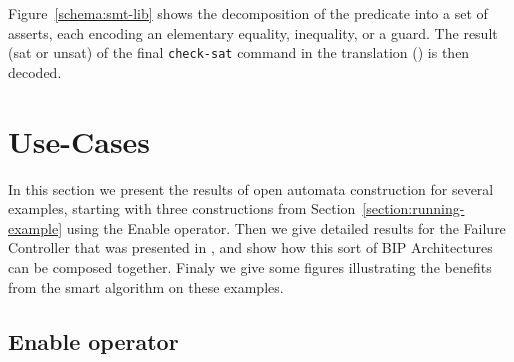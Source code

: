 \documentclass[smallcondensed]{svjour3}
\begin{document}
Figure~\ref{schema:smt-lib} shows the decomposition of the
predicate into a set of asserts, each encoding an elementary equality,
inequality, or a guard. 
The result (sat or unsat) of the final \texttt{check-sat} command in
the translation () is then decoded.

\section{Use-Cases}
\label{section:use-cases}
In this section we present the results of open automata construction
for several examples, starting with three constructions from
Section~\ref{section:running-example} using the Enable operator.
Then we give detailed results for the Failure Controller that was
presented in \cite{AVOCS18}, and show how this sort of BIP Architectures
can be composed together.
Finaly we give some figures illustrating the benefits from the smart
algorithm on these examples.

\subsection{Enable operator} 
\label{section:use-case:Enable}
\end{document}
